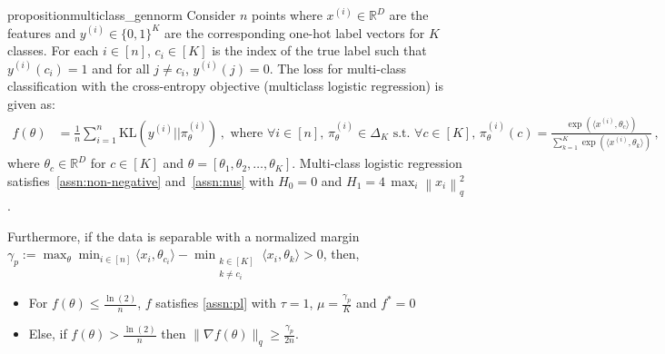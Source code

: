 \documentclass{article}
\newcommand{\normsq}[1]{\left\|#1 \right\|^{2}}
\newcommand{\R}{\mathbb{R}}
\begin{document}
\begin{restatable}{proposition}{multiclass_gennorm}
Consider $n$ points where $x^{(i)} \in \R^D$ are the features and $y^{(i)} \in \{0,1\}^K$ are the corresponding one-hot label vectors for $K$ classes. For each $i \in [n]$, $c_i \in [K]$ is the index of the true label such that $y^{(i)}(c_i) = 1$ and for all $j \neq c_i$, $y^{(i)}(j) = 0$. The loss for multi-class classification with the cross-entropy objective  (multiclass logistic regression) is given as:
\begin{align*}
f(\theta) & = \frac{1}{n} \sum_{i = 1}^{n} \text{KL}(y^{(i)} || \pi^{(i)}_\theta) \,, 
\text{ where $\forall i \in [n]$, $\pi^{(i)}_\theta \in \Delta_{K}$ s.t. $\forall c \in [K]$, } \pi^{(i)}_\theta(c) = \frac{\exp(\langle x^{(i)}, \theta_c \rangle)}{\sum_{k = 1}^{K} \exp(\langle x^{(i)}, \theta_k \rangle)} \,,
\end{align*}
where $\theta_c \in \R^D$ for $c \in [K]$ and $\theta = [\theta_1, \theta_2, \ldots, \theta_K]$. Multi-class logistic regression satisfies~\cref{assn:non-negative} and~\cref{assn:nus} with $H_0 = 0$ and $H_1 = 4 \, \max_i \normsq{x_i}_q$.

Furthermore, if the data is separable with a normalized margin $\gamma_p:= \max_\theta \min_{i\in [n]} \langle x_i, \theta_{c_i}\rangle - \min_{\substack{k \in [K] \\ k \neq c_i}} \langle x_i, \theta_k \rangle >0$, then,
\begin{itemize}
    \item For $f(\theta)\leq \frac{\ln(2)}{n}$, $f$ satisfies \cref{assn:pl} with $\tau = 1$, $\mu =\frac{\gamma_p}{K}$ and $f^* = 0$
    \item Else, if $f(\theta) > \frac{\ln(2)}{n}$ then $\|\nabla f(\theta)\|_q \geq \frac{\gamma_p}{2n}$.
\end{itemize}
\label{prop:multiclass}    
\end{restatable}
\end{document}
